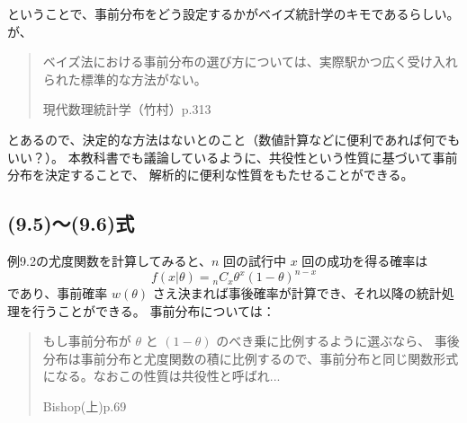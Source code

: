 \documentclass[10pt, a4paper]{ltjsarticle}
\begin{document}
ということで、事前分布をどう設定するかがベイズ統計学のキモであるらしい。が、

\begin{quote}
ベイズ法における事前分布の選び方については、実際駅かつ広く受け入れられた標準的な方法がない。

\hfill{現代数理統計学（竹村）p.313}
\end{quote}

とあるので、決定的な方法はないとのこと（数値計算などに便利であれば何でもいい？）。
本教科書でも議論しているように、共役性という性質に基づいて事前分布を決定することで、
解析的に便利な性質をもたせることができる。

% 
% 

\subsection{(9.5)〜(9.6)式}

例9.2の尤度関数を計算してみると、$n$ 回の試行中 $x$ 回の成功を得る確率は
\begin{equation}
  f(x|\theta) = {}_nC_x\theta^x(1-\theta)^{n-x}
\end{equation}
であり、事前確率 $w(\theta)$ さえ決まれば事後確率が計算でき、それ以降の統計処理を行うことができる。
事前分布については：

\begin{quote}
  もし事前分布が $\theta$ と $(1-\theta)$ のべき乗に比例するように選ぶなら、
   事後分布は事前分布と尤度関数の積に比例するので、事前分布と同じ関数形式になる。なおこの性質は共役性と呼ばれ...
   
   \hfill{Bishop(上)p.69}
\end{quote}
\end{document}
